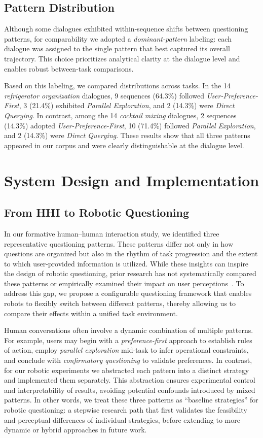 \documentclass[sigconf,authordraft]{acmart}
\begin{document}
\subsection{Pattern Distribution}
Although some dialogues exhibited within-sequence shifts between questioning patterns, for comparability we adopted a \textit{dominant-pattern} labeling: each dialogue was assigned to the single pattern that best captured its overall trajectory. This choice prioritizes analytical clarity at the dialogue level and enables robust between-task comparisons.

Based on this labeling, we compared distributions across tasks. In the 14 \textit{refrigerator organization} dialogues, 9 sequences (64.3\%) followed \textit{User-Preference-First}, 3 (21.4\%) exhibited \textit{Parallel Exploration}, and 2 (14.3\%) were \textit{Direct Querying}. In contrast, among the 14 \textit{cocktail mixing} dialogues, 2 sequences (14.3\%) adopted \textit{User-Preference-First}, 10 (71.4\%) followed \textit{Parallel Exploration}, and 2 (14.3\%) were \textit{Direct Querying}. These results show that all three patterns appeared in our corpus and were clearly distinguishable at the dialogue level.


\section{System Design and Implementation}
\subsection{From HHI to Robotic Questioning}
In our formative human–human interaction study, we identified three representative questioning patterns. These patterns differ not only in how questions are organized but also in the rhythm of task progression and the extent to which user-provided information is utilized. While these insights can inspire the design of robotic questioning, prior research has not systematically compared these patterns or empirically examined their impact on user perceptions~\cite{cakmak2012designing,hu2024designing,shin2023uncertainty}. To address this gap, we propose a configurable questioning framework that enables robots to flexibly switch between different patterns, thereby allowing us to compare their effects within a unified task environment.

Human conversations often involve a dynamic combination of multiple patterns. For example, users may begin with a \textit{preference-first} approach to establish rules of action, employ \textit{parallel exploration} mid-task to infer operational constraints, and conclude with \textit{confirmatory questioning} to validate preferences. In contrast, for our robotic experiments we abstracted each pattern into a distinct strategy and implemented them separately. This abstraction ensures experimental control and interpretability of results, avoiding potential confounds introduced by mixed patterns. In other words, we treat these three patterns as ``baseline strategies'' for robotic questioning: a stepwise research path that first validates the feasibility and perceptual differences of individual strategies, before extending to more dynamic or hybrid approaches in future work.
\end{document}
